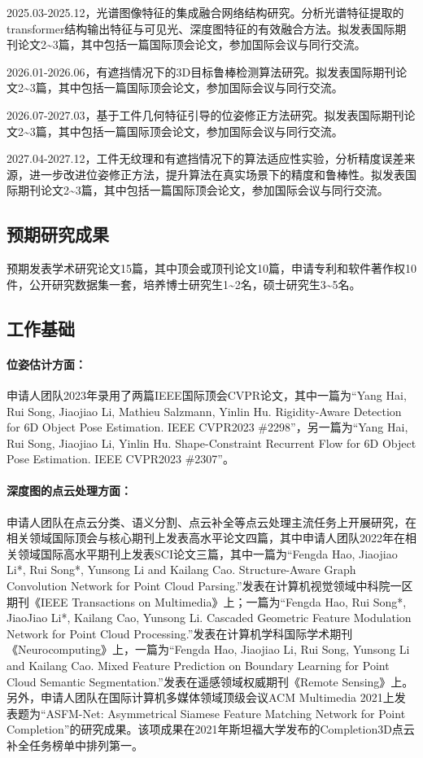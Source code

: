 \documentclass[12pt]{article}
\newcommand{\myPara}[1]{\paragraph{#1：}}
\begin{document}
2025.03-2025.12，光谱图像特征的集成融合网络结构研究。分析光谱特征提取的transformer结构输出特征与可见光、深度图特征的有效融合方法。拟发表国际期刊论文2\textasciitilde3篇，其中包括一篇国际顶会论文，参加国际会议与同行交流。

2026.01-2026.06，有遮挡情况下的3D目标鲁棒检测算法研究。拟发表国际期刊论文2\textasciitilde3篇，其中包括一篇国际顶会论文，参加国际会议与同行交流。

2026.07-2027.03，基于工件几何特征引导的位姿修正方法研究。拟发表国际期刊论文2\textasciitilde3篇，其中包括一篇国际顶会论文，参加国际会议与同行交流。

2027.04-2027.12，工件无纹理和有遮挡情况下的算法适应性实验，分析精度误差来源，进一步改进位姿修正方法，提升算法在真实场景下的精度和鲁棒性。拟发表国际期刊论文2\textasciitilde3篇，其中包括一篇国际顶会论文，参加国际会议与同行交流。

\subsection{预期研究成果}

预期发表学术研究论文15篇，其中顶会或顶刊论文10篇，申请专利和软件著作权10件，公开研究数据集一套，培养博士研究生1\textasciitilde2名，硕士研究生3\textasciitilde5名。




\subsection{工作基础}


\myPara{位姿估计方面}申请人团队2023年录用了两篇IEEE国际顶会CVPR论文，其中一篇为“Yang Hai, Rui Song, Jiaojiao Li, Mathieu Salzmann, Yinlin Hu. Rigidity-Aware Detection for 6D Object Pose Estimation. IEEE CVPR2023 \#2298”，另一篇为“Yang Hai, Rui Song, Jiaojiao Li, Yinlin Hu. Shape-Constraint Recurrent Flow for 6D Object Pose Estimation. IEEE CVPR2023 \#2307”。

\myPara{深度图的点云处理方面}申请人团队在点云分类、语义分割、点云补全等点云处理主流任务上开展研究，在相关领域国际顶会与核心期刊上发表高水平论文四篇，其中申请人团队2022年在相关领域国际高水平期刊上发表SCI论文三篇，其中一篇为“Fengda Hao, Jiaojiao Li*, Rui Song*, Yunsong Li and Kailang Cao. Structure-Aware Graph Convolution Network for Point Cloud Parsing.”发表在计算机视觉领域中科院一区期刊《IEEE Transactions on Multimedia》上；一篇为“Fengda Hao, Rui Song*, JiaoJiao Li*, Kailang Cao, Yunsong Li. Cascaded Geometric Feature Modulation Network for Point Cloud Processing.”发表在计算机学科国际学术期刊《Neurocomputing》上，一篇为“Fengda Hao, Jiaojiao Li, Rui Song, Yunsong Li and Kailang Cao. Mixed Feature Prediction on Boundary Learning for Point Cloud Semantic Segmentation.”发表在遥感领域权威期刊《Remote Sensing》上。另外，申请人团队在国际计算机多媒体领域顶级会议ACM Multimedia 2021上发表题为“ASFM-Net: Asymmetrical Siamese Feature Matching Network for Point Completion”的研究成果。该项成果在2021年斯坦福大学发布的Completion3D点云补全任务榜单中排列第一。
\end{document}
